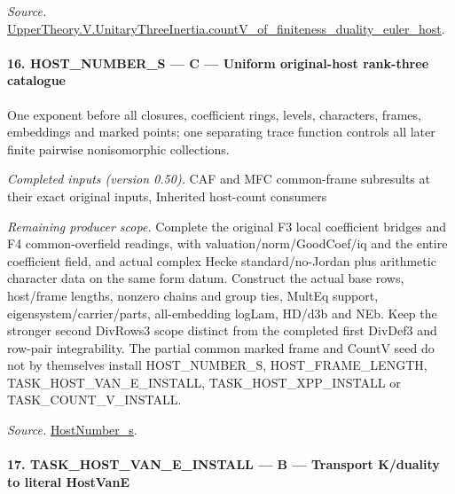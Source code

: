 \documentclass[11pt,a4paper]{article}
\numberwithin{equation}{section}
\theoremstyle{remark}\newtheorem{remark}[theorem]{Remark}
\begin{document}
\emph{Source.} \href{https://github.com/CocoSgt/riemann-hypothesis-lean/blob/7cbf7a0c32fca1badf05931879a37c3f8a2b03b4/src/Development/AutomorphicArithmetic/AutomorphicVarieties/ModularityArgument/ThresholdArguments/DenseThresholdCases/CountVOf.lean#L33-L60}{UpperTheory.V.UnitaryThreeInertia.countV\_\allowbreak of\_\allowbreak finiteness\_\allowbreak duality\_\allowbreak euler\_\allowbreak host}.



\paragraph{16. HOST\_\allowbreak NUMBER\_\allowbreak S — C — Uniform original-host rank-three catalogue}

One exponent before all closures, coefficient rings, levels, characters, frames, embeddings and marked points; one separating trace function controls all later finite pairwise nonisomorphic collections.

\emph{Completed inputs (version 0.50).} CAF and MFC common-frame subresults at their exact original inputs, Inherited host-count consumers

\emph{Remaining producer scope.} Complete the original F3 local coefficient bridges and F4 common-overfield readings, with valuation/norm/GoodCoef/iq and the entire coefficient field, and actual complex Hecke standard/no-Jordan plus arithmetic character data on the same form datum. Construct the actual base rows, host/frame lengths, nonzero chains and group ties, MultEq support, eigensystem/carrier/parts, all-embedding logLam, HD/d3b and NEb. Keep the stronger second DivRows3 scope distinct from the completed first DivDef3 and row-pair integrability. The partial common marked frame and CountV seed do not by themselves install HOST\_\allowbreak NUMBER\_\allowbreak S, HOST\_\allowbreak FRAME\_\allowbreak LENGTH, TASK\_\allowbreak HOST\_\allowbreak VAN\_\allowbreak E\_\allowbreak INSTALL, TASK\_\allowbreak HOST\_\allowbreak XPP\_\allowbreak INSTALL or TASK\_\allowbreak COUNT\_\allowbreak V\_\allowbreak INSTALL.

\emph{Source.} \href{https://github.com/CocoSgt/riemann-hypothesis-lean/blob/7cbf7a0c32fca1badf05931879a37c3f8a2b03b4/src/Development/AutomorphicArithmetic/AutomorphicVarieties/ModularityArgument/ThresholdArguments/DenseThresholdCases/HostNumberS.lean#L18-L28}{HostNumber\_\allowbreak s}.



\paragraph{17. TASK\_\allowbreak HOST\_\allowbreak VAN\_\allowbreak E\_\allowbreak INSTALL — B — Transport K/duality to literal HostVanE}
\end{document}
